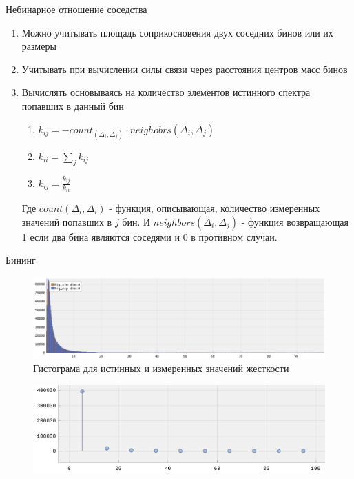 \documentclass[fullscreen=true,russian,compress,%
	hyperref={unicode,bookmarks=false}]{presentation}
\begin{document}
\begin{frame}{Небинарное отношение соседства}
   \begin{enumerate}
      \item Можно учитывать площадь соприкосновения двух соседних бинов или их размеры
      \item Учитывать при вычислении силы связи через расстояния центров масс бинов
      \item Вычислять основываясь на количество элементов истинного спектра попавших в данный бин
      \begin{enumerate}
         \item  $k_{ij} = - count_(\Delta_{i}, \Delta_{j}) \cdot neighobrs(\Delta_{i}, \Delta_{j})$ \\
         \item  $k_{ii} = \displaystyle\sum_{j} k_{ij}$ \\
         \item  $k_{ij} = \frac{k_{ij}}{k_{ii}}$
      \end{enumerate}
      Где $count(\Delta_{i}, \Delta_{i})$ - функция, описывающая, количество измеренных значений попавших в $j$ бин. 
      И $neighbors(\Delta_{i}, \Delta_{j})$ - функция возвращающая 1 если два бина являются соседями и 0 в противном случаи.
   \end{enumerate}
\end{frame}


\begin{frame}{Бининг}
   \begin{figure}[h!]
      \centering
      \includegraphics[width=\linewidth]{images/rig_dist.png}
      \caption{Гистограма для истинных и измеренных значений жесткости}
      \label{photo:rig_dist}
   \end{figure}
   \begin{figure}[h!]
      \centering
      \includegraphics[scale=0.55]{images/rig_static_binning.png}
   \end{figure}
\end{frame}
\end{document}
